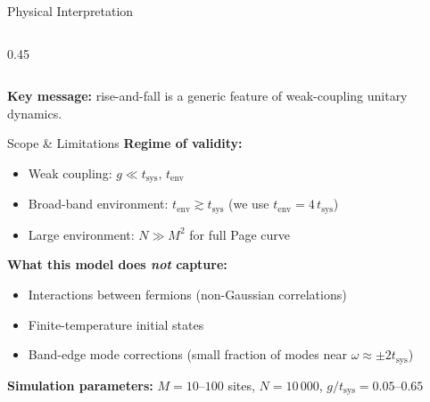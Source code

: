 \documentclass[aspectratio=169,11pt]{beamer}
\begin{document}
\begin{frame}{Physical Interpretation}
\begin{columns}
\begin{column}{0.45\textwidth}
\begin{center}
            \end{center}
        \end{column}
    \end{columns}

    \vspace{0.1cm}
    \textbf{Key message:} rise-and-fall is a generic feature of weak-coupling unitary dynamics.
\end{frame}

\begin{frame}{Scope \& Limitations}
    \textbf{Regime of validity:}
    \begin{itemize}
        \item Weak coupling: $g \ll t_{\mathrm{sys}},\, t_{\mathrm{env}}$
        \item Broad-band environment: $t_{\mathrm{env}} \gtrsim t_{\mathrm{sys}}$ (we use $t_{\mathrm{env}} = 4\,t_{\mathrm{sys}}$)
        \item Large environment: $N \gg M^2$ for full Page curve
    \end{itemize}

    \vspace{0.3cm}
    \textbf{What this model does \emph{not} capture:}
    \begin{itemize}
        \item Interactions between fermions (non-Gaussian correlations)
        \item Finite-temperature initial states
        \item Band-edge mode corrections (small fraction of modes near $\omega \approx \pm 2t_{\mathrm{sys}}$)
    \end{itemize}

    \vspace{0.3cm}
    \textbf{Simulation parameters:} $M = 10$--$100$ sites, $N = 10\,000$, $g/t_{\mathrm{sys}} = 0.05$--$0.65$
\end{frame}
\end{document}
